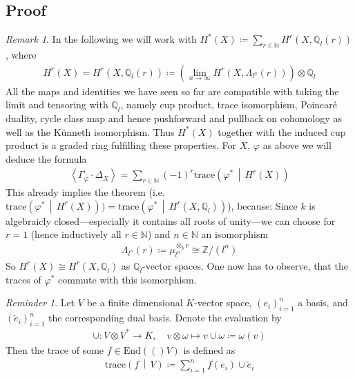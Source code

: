 \documentclass[english]{scrartcl}
\theoremstyle{definition}
\theoremstyle{remark}
\newtheorem{Rem}[Def]{Remark}
\newtheorem{Rev}[Def]{Reminder}
\newcommand*{\N}{\mathds{N}}
\newcommand*{\Z}{\mathds{Z}}
\newcommand*{\Q}{\mathds{Q}}
\newcommand*{\Zmod}[1]{\Z/#1} %
\newcommand*{\Zl}{\Z_l} %
\newcommand*{\Ql}{\Q_l} %
\newcommand*{\End}[1]{\text{End}(#1)} %
\newcommand*{\idest}{i.e.\ }
\newcommand*{\M}{\Lambda}
\newcommand*{\intProd}[2]{{#1\cdot#2}} %
\newcommand*{\intNum}[1]{{\left\langle{#1}\right\rangle}} %
\newcommand*{\Graph}[1]{{\Gamma_{#1}}} %
\newcommand*{\Diag}[1]{{\Delta_{#1}}} %
\newcommand*{\trace}[2]{{\text{trace}\left(#1 \,\middle|\, #2 \right)}} %
\renewcommand*{\phi}{\varphi}
\begin{document}
\subsection{Proof}
\begin{Rem}
  In the following we will work with
  $H^*(X)\coloneqq\sum_{r\in\N} H^r(X, \Ql(r))$, where
  \begin{gather*}
    H^r(X) = H^r(X,\Ql(r)) \coloneqq
    \left(\lim_{n\to\infty} H^r(X,\M_{l^n}(r))\right) \otimes \Ql
  \end{gather*}
  All the maps and identities we have seen so far are compatible with
  taking the limit and tensoring with $\Ql$, namely
  cup product,
  trace isomorphism,
  Poincaré duality,
  cycle class map and hence
  pushforward and pullback on cohomology as well as
  the Künneth isomorphism.
  Thus $H^*(X)$ together with the induced cup product is a graded ring
  fulfilling these properties.
  For $X$, $\phi$ as above we will deduce the formula
  \begin{gather*}
    \intNum{\intProd{\Graph{\phi}}{\Diag{X}}}
    = \sum_{r\in\N} (-1)^r \trace{\phi^*}{H^r(X)}
  \end{gather*}
  This already implies the theorem
  (\idest $\trace{\phi^*}{H^r(X)})=\trace{\phi^*}{H^r(X,\Ql)}$),
  because:
  Since $k$ is algebraicly closed---especially it contains all
  roots of unity---we can choose for $r=1$ (hence inductively all
  $r\in\N$) and $n\in\N$ an isomorphism
  \begin{gather*}
    \M_{l^n}(r)\coloneqq\mu_{l^n}^{\otimes_k r} \cong \Zmod{(l^n)}
  \end{gather*}
  So $H^r(X)\cong H^r(X,\Ql)$ as $\Ql$-vector spaces.
  One now has to observe, that the traces of $\phi^*$ commute with
  this isomorphism.
\end{Rem} 

\begin{Rev}
  Let $V$ be a finite dimensional $K$-vector space, $(e_i)_{i=1}^n$ a basis,
  and $(\check e_i)_{i=1}^n$ the corresponding dual basis.
  Denote the evaluation by
  \begin{align*}
    \cup\colon V\otimes V^* \to K,\quad
    v\otimes \omega \mapsto v\cup\omega\coloneqq \omega(v)
  \end{align*}
  Then the trace of some $f\in\End(V)$ is defined as
  \begin{gather*}
    \trace{f}{V} \coloneqq \sum_{i=1}^n f(e_i)\cup \check e_i
  \end{gather*}
\end{Rev}
\end{document}
